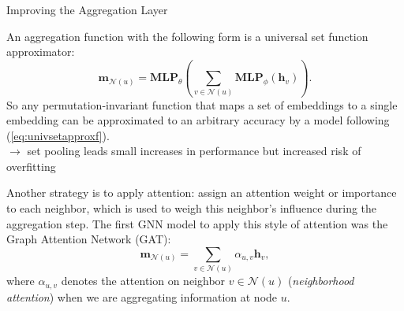 \documentclass[10pt, aspectratio=169, compress, protectframetitle, handout]{beamer}
\begin{document}
\begin{frame}{Improving the Aggregation Layer}

    An aggregation function with the following form is a \alert{universal set function approximator}:
    \begin{equation}
        \mathbf m_{\mathcal N(u)} = \textbf{MLP}_\theta \left( \sum_{v \in \mathcal N(u)} \textbf{MLP}_\phi (\mathbf h_v) \right).
        \label{eq:univsetapproxf}
    \end{equation}
    So any permutation-invariant function that maps a set of embeddings to a single embedding can be approximated to an arbitrary accuracy by a model following (\autoref{eq:univsetapproxf}).\\
    $\longrightarrow$ \alert{set pooling} leads small increases in performance but increased risk of overfitting
    
    Another strategy is to apply \alert{attention}: assign an attention weight or importance to each neighbor, which is used to weigh this neighbor’s influence during the aggregation step. The first GNN model to apply this style of attention was the \alert{Graph Attention Network (GAT)}:
    \begin{equation}
        \mathbf m_{\mathcal N(u)} = \sum_{v \in \mathcal N(u)} \alpha_{u,v} \mathbf h_v,
    \end{equation}
    where $\alpha_{u,v}$ denotes the attention on neighbor $v \in \mathcal N(u)$ (\emph{neighborhood attention}) when we are aggregating information at node $u$.
    
\end{frame}
\end{document}
